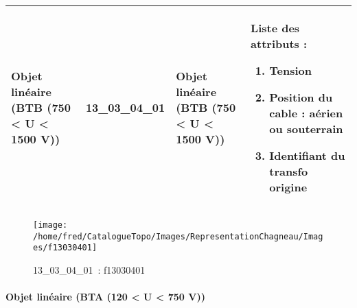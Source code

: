 \documentclass[12pt,titlepage]{book}
\begin{document}
\renewcommand{\arraystretch}{1.2}
\begin{supertabular}{|p{10cm}|c|p{13cm}|p{12cm}|}
 Objet linéaire (BTB (750 < U < 1500 V)) & 13\_03\_04\_01 & Objet linéaire (BTB (750 < U < 1500 V)) & Liste des attributs :
\begin{enumerate}
  \item Tension  \item Position du cable : aérien ou souterrain  \item Identifiant du transfo origine\end{enumerate}
\\
\hline
\end{supertabular}
\begin{figure}[h!]
  \hfill         %
  \begin{minipage}[t]{3cm}
    \begin{center}
      \texttt{[image: /home/fred/CatalogueTopo/Images/RepresentationChagneau/Images/f13030401]}
      \caption[~13\_03\_04\_01]{\small{13\_03\_04\_01~:} \tiny{f13030401}}\label{f13030401}
    \end{center}
  \end{minipage}
\end{figure}


\paragraph{Objet linéaire (BTA (120 < U < 750 V))}
\noindent
\vspace{\baselineskip}
\end{document}

